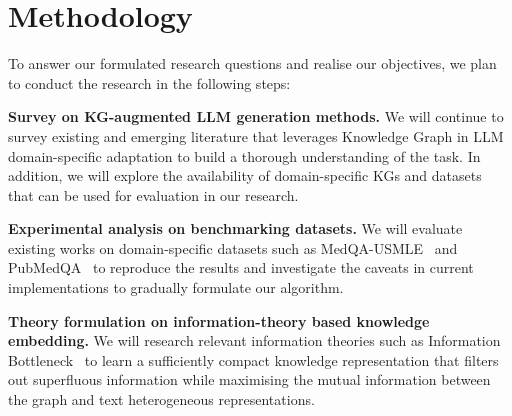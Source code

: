 \section*{Methodology}

To answer our formulated research questions and realise our objectives, we plan to conduct the research in the following steps:

\textbf{Survey on KG-augmented LLM generation methods. } 
We will continue to survey existing and emerging literature that leverages Knowledge Graph in LLM domain-specific adaptation to build a thorough understanding of the task. 
In addition, we will explore the availability of domain-specific KGs and datasets that can be used for evaluation in our research.

\textbf{Experimental analysis on benchmarking datasets. } 
We will evaluate existing works on domain-specific datasets such as MedQA-USMLE~\parencite{medqa} and PubMedQA~\parencite{pubmedqa} to reproduce the results and investigate the caveats in current implementations to gradually formulate our algorithm.

\textbf{Theory formulation on information-theory based knowledge embedding. } 
We will research relevant information theories such as Information Bottleneck~\parencite{IB, vib, gib} to learn a sufficiently compact knowledge representation that filters out superfluous information while maximising the mutual information between the graph and text heterogeneous representations.


